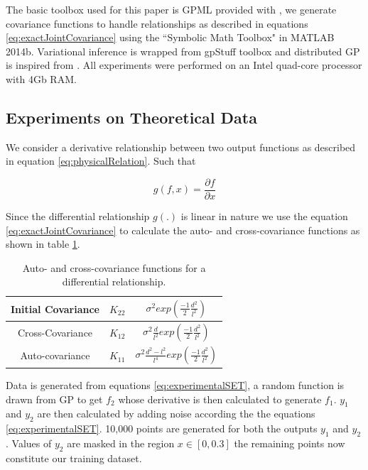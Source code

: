 The basic toolbox used for this paper is GPML provided with \cite{Rasmussen2005}, we generate covariance functions to handle relationships as described in equations \ref{eq:exactJointCovariance} using the ``Symbolic Math Toolbox" in MATLAB 2014b. Variational inference is wrapped from gpStuff toolbox \cite{Vanhatalo:2013:GBM:2567709.2502617} and distributed GP is inspired from \cite{deisenroth2015distributed}. All experiments were performed on an Intel quad-core processor with 4Gb RAM.
  
\subsection{Experiments on Theoretical Data}\label{sub:experimentsSyntheticData}
We consider a derivative relationship between two output functions as described in equation \ref{eq:physicalRelation}. Such that 

\begin{equation*}\label{eq:derivativeEquation}
   g(f, x) = \frac{\partial f}{\partial x} 
\end{equation*}

Since the differential relationship \(g(.)\) is linear in nature we use the equation \ref{eq:exactJointCovariance} to calculate the auto- and cross-covariance functions as shown in table \ref{tab:differentialCovariances}.

\begin{table}[h]
\renewcommand{\arraystretch}{1.5}
\caption{Auto- and cross-covariance functions for a differential relationship.}\label{tab:differentialCovariances} \centering
\begin{tabular}{|c|c|c|}
  \hline
  Initial Covariance & \(K_{22}\) & \(\sigma ^{2}exp(\frac{-1}{2}\frac{d^{2}}{l^{2}})\) \\
  \hline
  Cross-Covariance & \(K_{12}\) &  \(\sigma ^{2}\frac{d}{l^{2}}exp(\frac{-1}{2}\frac{d^{2}}{l^{2}})\) \\
  \hline
  Auto-covariance & \(K_{11}\) & \(\sigma ^{2}\frac{d^{2}-l^{2}}{l^{4}}exp(\frac{-1}{2}\frac{d^{2}}{l^{2}})\) \\
  \hline
\end{tabular}
\end{table}

Data is generated from equations \ref{eq:experimentalSET}, a random function is drawn from GP to get \(f_{2}\) whose derivative is then calculated to generate \(f_{1}\). \(y_{1}\) and \(y_{2}\) are then calculated by adding noise according the the equations \ref{eq:experimentalSET}. 10,000 points are generated for both the outputs \(y_{1}\) and \(y_{2}\). Values of \(y_{2}\) are masked in the region \(x \in [0, 0.3]\) the remaining points now constitute our training dataset. 

